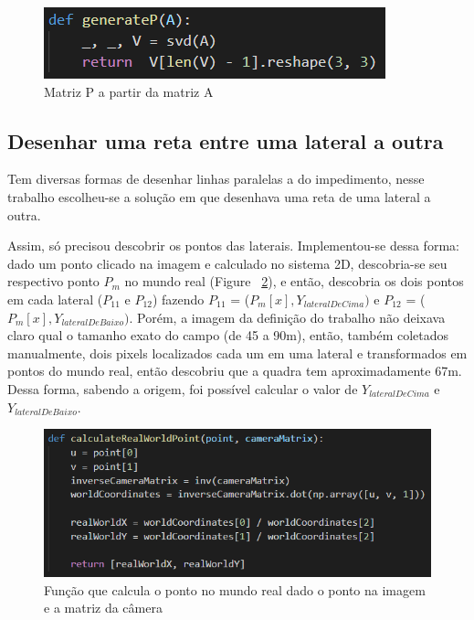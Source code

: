 \documentclass{article}
\begin{document}
        \begin{figure}[h!]         \centering
        \includegraphics[scale=1]{matrizP.PNG}
        \caption{Matriz P a partir da matriz A}
        \label{fig:matrizP}
        \end{figure}

    \subsection{Desenhar uma reta entre uma lateral a outra}
    Tem diversas formas de desenhar linhas paralelas a do impedimento, nesse trabalho escolheu-se a solução em que desenhava uma reta de uma lateral a outra.

    Assim, só precisou descobrir os pontos das laterais. Implementou-se dessa forma: dado um ponto clicado na imagem e calculado no sistema 2D, descobria-se seu respectivo ponto \(P_m\) no mundo real (Figure ~\ref{fig:calculateRealWorldPoint}), e então, descobria os dois pontos em cada lateral (\(P_{11}\) e \(P_{12}\)) fazendo \(P_{11}\) = (\(P_m[x], Y_{lateralDeCima})\) e \(P_{12}\) = (\(P_m[x], Y_{lateralDeBaixo})\). Porém, a imagem da definição do trabalho não deixava claro qual o tamanho exato do campo (de 45 a 90m), então, também coletados manualmente, dois pixels localizados cada um em uma lateral e transformados em pontos do mundo real, então descobriu que a quadra tem aproximadamente 67m. Dessa forma, sabendo a origem, foi possível calcular o valor de \(Y_{lateralDeCima}\) e \(Y_{lateralDeBaixo}\).

        \begin{figure}[h!]
        \centering
        \includegraphics[scale=0.9]{calculateRealWorldPoint.PNG}
        \caption{Função que calcula o ponto no mundo real dado o ponto na imagem e a matriz da câmera}
        \label{fig:calculateRealWorldPoint}
        \end{figure}
\end{document}
